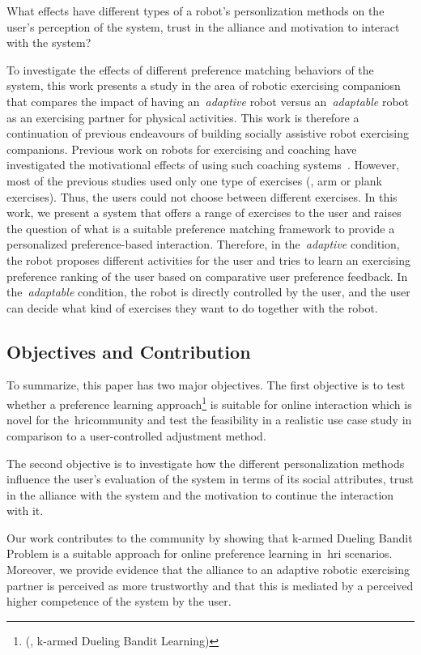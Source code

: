 \documentclass[twocolumn]{svjour3}          %
\begin{document}
What effects have different types of a robot's personlization methods on the
user's perception of the system, trust in the alliance and motivation to interact with the
system?

To investigate the effects of different preference matching behaviors of
the system, this work presents a study in the area of robotic exercising companiosn that compares the impact of having
an~\textit{adaptive} robot versus an~\textit{adaptable} robot as an exercising partner for
physical activities. This work is therefore a continuation of previous endeavours of building socially assistive robot exercising companions. Previous work on robots for exercising and coaching have investigated the motivational effects of using such coaching systems~\autocite{fasola2013socially,schneider2016exercising,guneysu2017}.
However, most of the previous studies used only one type of exercises (\eg{}, arm or plank exercises). Thus, the users could not choose between different exercises. In this work, we present a system that offers a range of exercises to the user and raises the question of what
is a suitable preference matching framework to provide a personalized preference-based interaction. Therefore, in the~\textit{adaptive} condition, the robot proposes different activities for the user and tries to learn an exercising preference ranking of the user based on comparative user preference feedback. In the~\textit{adaptable} condition, the robot is directly controlled by the user, and the user can decide what kind of exercises they want to do together with the robot.

\subsection{Objectives and Contribution}
To summarize, this paper has two major objectives. The first objective is to test whether a preference learning approach\footnote{(\ie{}, k-armed Dueling Bandit Learning)} is suitable for online interaction which is novel for the~\gls{hri}community and test the feasibility in a realistic use case study in comparison to a user-controlled adjustment method. 

The second objective is to investigate how the different personalization methods influence the user's evaluation of the system in terms of its social attributes, trust in the alliance with the system and the motivation to continue the interaction with it. 

Our work contributes to the community by showing that k-armed Dueling Bandit Problem is a suitable approach for online preference learning in~\gls{hri} scenarios. Moreover, we provide evidence that the alliance to an adaptive robotic exercising partner is perceived as more trustworthy and that this is mediated by a perceived higher competence of the system by the user.
\end{document}
